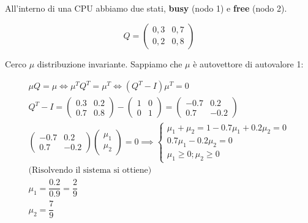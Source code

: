 \begin{exrc}
	All'interno di una CPU abbiamo due stati, \textbf{busy} (nodo 1) e \textbf{free} (nodo 2).
	
	\begin{equation*}
	Q = \begin{pmatrix}
	0,3 & 0,7 \\
	0,2 & 0,8
	\end{pmatrix}
	\end{equation*}
	
	Cerco $ \mu $ distribuzione invariante. Sappiamo che $ \mu $ \`e autovettore di autovalore 1:
	
	\begin{equation*}
	\begin{aligned}
	\mu Q = \mu \iff \mu^T Q^T = \mu^T \iff (Q^T -I)\mu^T = 0 \\
	Q^T - I = \begin{pmatrix}
	0.3 & 0.2 \\
	0.7 & 0.8
	\end{pmatrix} - \begin{pmatrix}
	1 & 0 \\ 0 & 1
	\end{pmatrix} = \begin{pmatrix}
	-0.7 & 0.2 \\
	0.7 & -0.2
	\end{pmatrix} \\
	\begin{pmatrix}
	-0.7 & 0.2 \\
	0.7 & -0.2
	\end{pmatrix} \begin{pmatrix}
	\mu_1 \\ \mu_2
	\end{pmatrix} = 0 
	\implies \begin{cases}
	\mu_1 + \mu_2 = 1
	-0.7\mu_1 + 0.2 \mu_2 = 0 \\
	0.7\mu_1 - 0.2 \mu_2 = 0 \\
	\mu_1 \geq 0; \mu_2 \geq 0
	\end{cases} \\
	\text{(Risolvendo il sistema si ottiene)} \\
	\mu_1 = \dfrac{0.2}{0.9} = \dfrac{2}{9} \\
	\mu_2 = \dfrac{7}{9}
	\end{aligned}
	\end{equation*}
\end{exrc}

